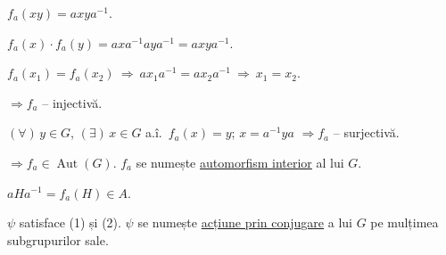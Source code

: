 \bigskip
\noindent $f_a(xy)=axya^{-1}$.

\noindent $f_a(x)\cdot f_a(y)=axa^{-1}aya^{-1}=axya^{-1}$.

\bigskip
\noindent $f_a(x_1)=f_a(x_2)\ \Longrightarrow\ ax_1a^{-1}=ax_2a^{-1}
\ \Longrightarrow\ x_1=x_2$.

\noindent $\Longrightarrow f_a$ -- injectivă.

\medskip
\noindent $(\forall)\,y\in G$, $(\exists)\,x\in G$ a.î.\ $f_a(x)=y$;
\quad $x=a^{-1}ya$ $\Longrightarrow f_a$ -- surjectivă.

\bigskip
\noindent $\Longrightarrow f_a\in\operatorname{Aut}(G)$.
\quad $f_a$ se numește \underline{automorfism interior} al lui $G$.

\bigskip
\noindent $aHa^{-1}=f_a(H)\in A$.

\bigskip
\noindent $\psi$ satisface (1) și (2). $\psi$ se numește
\underline{acțiune prin conjugare} a lui $G$ pe mulțimea subgrupurilor sale.
